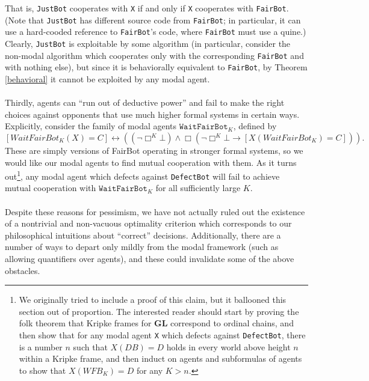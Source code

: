 \documentclass[12pt, letterpaper]{article}
\numberwithin{equation}{section}
\begin{document}
\begin{algorithm}[H]
\label{JustBot}


 \caption{\texttt{JustBot (JB)}}
\end{algorithm}
That is, \texttt{JustBot} cooperates with \texttt{X} if and only if \texttt{X} cooperates with \texttt{FairBot}. (Note that \texttt{JustBot} has different source code from \texttt{FairBot}; in particular, it can use a hard-cooded reference to \texttt{FairBot}'s code, where \texttt{FairBot} must use a quine.) Clearly, \texttt{JustBot} is exploitable by some algorithm (in particular, consider the non-modal algorithm which cooperates only with the corresponding \texttt{FairBot} and with nothing else), but since it is behaviorally equivalent to \texttt{FairBot}, by Theorem \ref{behavioral} it cannot be exploited by any modal agent.
\\
\\ Thirdly, agents can ``run out of deductive power'' and fail to make the right choices against opponents that use much higher formal systems in certain ways. Explicitly, consider the family of modal agents $\texttt{WaitFairBot}_K$, defined by $$[WaitFairBot_K(X)=C]\leftrightarrow ((\neg\Box^K\bot)\wedge \Box(\neg\Box^K\bot\to [X(WaitFairBot_K)=C])).$$ These are simply versions of FairBot operating in stronger formal systems, so we would like our modal agents to find mutual cooperation with them. As it turns out\footnote{We originally tried to include a proof of this claim, but it ballooned this section out of proportion. The interested reader should start by proving the folk theorem that Kripke frames for \textbf{GL} correspond to ordinal chains, and then show that for any modal agent \texttt{X} which defects against \texttt{DefectBot}, there is a number $n$ such that $X(DB)=D$ holds in every world above height $n$ within a Kripke frame, and then induct on agents and subformulas of agents to show that $X(WFB_K)=D$ for any $K>n$.}, any modal agent which defects against \texttt{DefectBot} will fail to achieve mutual cooperation with $\texttt{WaitFairBot}_K$ for all sufficiently large $K$.
\\
\\ Despite these reasons for pessimism, we have not actually ruled out the existence of a nontrivial and non-vacuous optimality criterion which corresponds to our philosophical intuitions about ``correct'' decisions. Additionally, there are a number of ways to depart only mildly from the modal framework (such as allowing quantifiers over agents), and these could invalidate some of the above obstacles.
\end{document}
